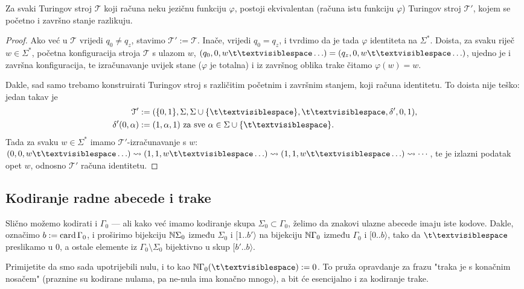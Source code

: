 \begin{lema}\label{lm:bsomp-q0neqz}
Za svaki Turingov stroj $\mathcal T$ koji računa neku jezičnu funkciju $\varphi$, postoji ekvivalentan (računa istu funkciju $\varphi$) Turingov stroj $\mathcal T'$, kojem se početno i završno stanje razlikuju.
\end{lema}
\begin{proof}
Ako već u $\mathcal T$ vrijedi $q_0\not=q_z$, stavimo $\mathcal T':=\mathcal T$. Inače, vrijedi $q_0=q_z$, i tvrdimo da je tada $\varphi$ identiteta na $\Sigma^*$. Doista, za svaku riječ $w\in\Sigma^*$, početna konfiguracija stroja $\mathcal T$ s ulazom $w$, $(q_0,0,w\bl\ldots)=(q_z,0,w\bl\ldots)$, ujedno je i završna konfiguracija, te izračunavanje uvijek stane ($\varphi$ je totalna) i iz završnog oblika trake čitamo $\varphi(w)=w$.

Dakle, sad samo trebamo konstruirati Turingov stroj s različitim početnim i za\-vrš\-nim stanjem, koji računa identitetu. To doista nije teško: jedan takav je
\begin{align}
    \mathcal T'&:=(\{0,1\},\Sigma,\Sigma\cup\{\bl\},\bl,\delta',0,1)\text,\\
    \delta'(0,\alpha)&:=(1,\alpha,1)\text{ za sve $\alpha\in\Sigma\cup\{\bl\}$.}
\end{align}
Tada za svaku $w\in\Sigma^*$ imamo $\mathcal T'$-izračunavanje s $w$: $(0,0,w\bl\ldots)\leadsto(1,1,w\bl\ldots)\leadsto(1,1,w\bl\ldots)\leadsto\cdots$,
te je izlazni podatak opet $w$, odnosno $\mathcal T'$ računa identitetu.
\end{proof}

\subsection{Kodiranje radne abecede i trake}

Slično možemo kodirati i $\Gamma_0$ --- ali kako već imamo kodiranje skupa $\Sigma_0\subset\Gamma_0$, želimo da znakovi ulazne abecede imaju iste kodove. Dakle, označimo $b:=\operatorname{card}\Gamma_0$, i proširimo bijekciju ${\mathbb N}\Sigma_0$ između $\Sigma_0$ i $[1..b'\rangle$ na bijekciju ${\mathbb N}\Gamma_0$ između $\Gamma_0$ i $[0..b\rangle$, tako da $\bl$ preslikamo u $0$, a ostale elemente iz $\Gamma_0\setminus\Sigma_0$ bijektivno u skup $[b'..b\rangle$.

Primijetite da smo sada upotrijebili nulu, i to kao $\N\Gamma_0(\bl):=0$. To pruža opravdanje za frazu "traka je s konačnim nosačem" (praznine su kodirane nulama, pa ne-nula ima konačno mnogo), a bit će esencijalno i za kodiranje trake.

